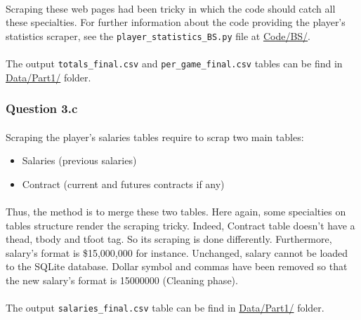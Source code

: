 \paragraph{}Scraping these web pages had been tricky in which the code should catch all these specialties. For further information about the code providing the player's statistics scraper, see the \verb|player_statistics_BS.py| file at \url{Code/BS/}.

\paragraph{}The output \verb|totals_final.csv| and \verb|per_game_final.csv| tables can be find in \url{Data/Part1/} folder.

\subsubsection{Question 3.c}
\label{subsubsec:313c}

\paragraph{}Scraping the player's salaries tables require to scrap two main tables:

\begin{itemize}
	\item Salaries (previous salaries)
	\item Contract (current and futures contracts if any)
\end{itemize}

\paragraph{}Thus, the method is to merge these two tables. Here again, some specialties on tables structure render the scraping tricky. Indeed, Contract table doesn't have a thead, tbody and tfoot tag. So its scraping is done differently. Furthermore, salary's format is \$15,000,000 for instance. Unchanged, salary cannot be loaded to the SQLite database. Dollar symbol and commas have been removed so that the new salary's format is 15000000 (Cleaning phase).

\paragraph{}The output \verb|salaries_final.csv| table can be find in \url{Data/Part1/} folder.

